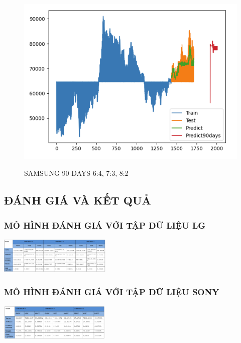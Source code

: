 \documentclass{article}
\begin{document}
\begin{multicols}{2}
\begin{figure}[H]
\begin{minipage}{0.15\textwidth}
    \label{fig:2}
    \end{minipage}%
    \begin{minipage}{0.15\textwidth}
    \centering
    \includegraphics[width=1\textwidth]{Image/Light GBM/SS_8_2_90.png}

    \label{fig:3}
    \end{minipage}
    \caption{SAMSUNG 90 DAYS  6:4, 7:3, 8:2 }
\end{figure}


\subsection{ĐÁNH GIÁ VÀ KẾT QUẢ }
\subsubsection{MÔ HÌNH ĐÁNH GIÁ VỚI TẬP DỮ LIỆU LG }
\includegraphics[width=0.4\textwidth]{Image/ket qua/LG.png}
\subsubsection{MÔ HÌNH ĐÁNH GIÁ VỚI TẬP DỮ LIỆU SONY}
\includegraphics[width=0.4\textwidth]{Image/ket qua/SONY.png}

\end{multicols}
\end{document}
